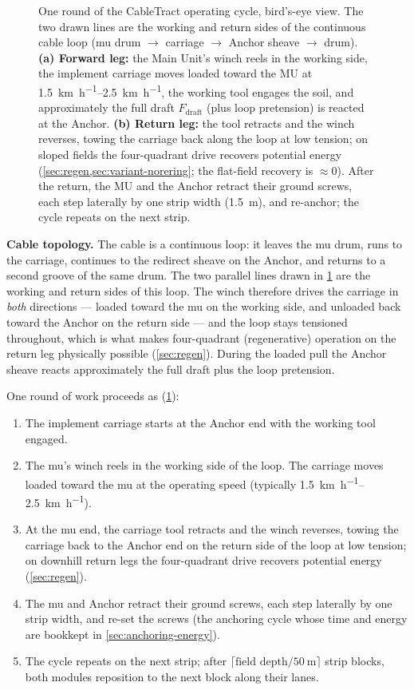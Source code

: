 \documentclass[11pt,a4paper]{article}
\begin{document}
\begin{figure}[H]
\begin{tikzpicture}
\end{tikzpicture}
\caption{One round of the CableTract operating cycle, bird's-eye view. The two drawn lines are the working and return sides of the continuous cable loop (\gls{mu} drum $\to$ carriage $\to$ Anchor sheave $\to$ drum). \textbf{(a) Forward leg:} the Main Unit's winch reels in the working side, the implement carriage moves loaded toward the MU at \SIrange{1.5}{2.5}{\kilo\meter\per\hour}, the working tool engages the soil, and approximately the full draft $F_{\text{draft}}$ (plus loop pretension) is reacted at the Anchor. \textbf{(b) Return leg:} the tool retracts and the winch reverses, towing the carriage back along the loop at low tension; on sloped fields the four-quadrant drive recovers potential energy (\cref{sec:regen,sec:variant-norering}; the flat-field recovery is ${\approx}0$). After the return, the MU and the Anchor retract their ground screws, each step laterally by one strip width (\SI{1.5}{\meter}), and re-anchor; the cycle repeats on the next strip.}
\label{fig:f0c}
\end{figure}

\textbf{Cable topology.} The cable is a continuous loop: it leaves the \gls{mu} drum, runs to the carriage, continues to the redirect sheave on the Anchor, and returns to a second groove of the same drum. The two parallel lines drawn in \cref{fig:f0c} are the working and return sides of this loop. The winch therefore drives the carriage in \emph{both} directions --- loaded toward the \gls{mu} on the working side, and unloaded back toward the Anchor on the return side --- and the loop stays tensioned throughout, which is what makes four-quadrant (regenerative) operation on the return leg physically possible (\cref{sec:regen}). During the loaded pull the Anchor sheave reacts approximately the full draft plus the loop pretension.

One round of work proceeds as (\cref{fig:f0c}):

\begin{enumerate}[leftmargin=1.6em,itemsep=0.1em]
    \item The implement carriage starts at the Anchor end with the working tool engaged.
    \item The \gls{mu}'s winch reels in the working side of the loop. The carriage moves loaded toward the \gls{mu} at the operating speed (typically \SIrange{1.5}{2.5}{\kilo\meter\per\hour}).
    \item At the \gls{mu} end, the carriage tool retracts and the winch reverses, towing the carriage back to the Anchor end on the return side of the loop at low tension; on downhill return legs the four-quadrant drive recovers potential energy (\cref{sec:regen}).
    \item The \gls{mu} and Anchor retract their ground screws, each step laterally by one strip width, and re-set the screws (the anchoring cycle whose time and energy are bookkept in \cref{sec:anchoring-energy}).
    \item The cycle repeats on the next strip; after $\lceil \text{field depth}/\SI{50}{\meter}\rceil$ strip blocks, both modules reposition to the next block along their lanes.
\end{enumerate}
\end{document}

